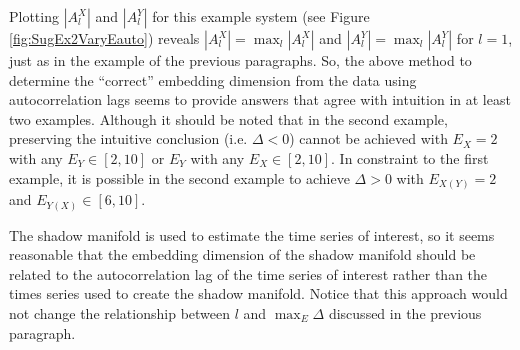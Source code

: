 \documentclass[a4paper,11pt]{article}
\begin{document}
Plotting $|A_l^X|$ and $|A_l^Y|$ for this example system (see Figure \ref{fig:SugEx2VaryEauto}) reveals $|A_l^X|=\max_l |A_l^X|$ and $|A_l^Y|=\max_l |A_l^Y|$ for $l=1$, just as in the example of the previous paragraphs.  So, the above method to determine the ``correct'' embedding dimension from the data using autocorrelation lags seems to provide answers that agree with intuition in at least two examples.  Although it should be noted that in the second example, preserving the intuitive conclusion (i.e. $\Delta<0$) cannot be achieved with $E_X=2$ with any $E_Y\in[2,10]$ or $E_Y$ with any $E_X\in[2,10]$.  In constraint to the first example, it is possible in the second example to achieve $\Delta>0$ with $E_{X(Y)}=2$ and $E_{Y(X)}\in[6,10]$.

The shadow manifold is used to estimate the time series of interest, so it seems reasonable that the embedding dimension of the shadow manifold should be related to the autocorrelation lag of the time series of interest rather than the times series used to create the shadow manifold.  Notice that this approach would not change the relationship between $l$ and $\max_E \Delta$ discussed in the previous paragraph.
\end{document}
